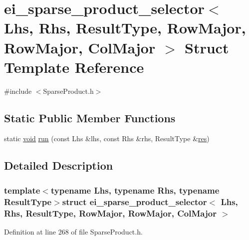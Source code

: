 \hypertarget{structei__sparse__product__selector_3_01_lhs_00_01_rhs_00_01_result_type_00_01_row_major_00_01_row_major_00_01_col_major_01_4}{\section{ei\-\_\-sparse\-\_\-product\-\_\-selector$<$ Lhs, Rhs, Result\-Type, Row\-Major, Row\-Major, Col\-Major $>$ Struct Template Reference}
\label{structei__sparse__product__selector_3_01_lhs_00_01_rhs_00_01_result_type_00_01_row_major_00_01_row_major_00_01_col_major_01_4}
}


{\ttfamily \#include $<$Sparse\-Product.\-h$>$}

\subsection*{Static Public Member Functions}
\begin{DoxyCompactItemize}
\item 
static \hyperlink{group___u_a_v_objects_plugin_ga444cf2ff3f0ecbe028adce838d373f5c}{void} \hyperlink{structei__sparse__product__selector_3_01_lhs_00_01_rhs_00_01_result_type_00_01_row_major_00_01_row_major_00_01_col_major_01_4_a41c17c70dc66444e35d3d739c19008bc}{run} (const Lhs \&lhs, const Rhs \&rhs, Result\-Type \&\hyperlink{glext_8h_a1dbb21208b9047cc8031ca9c840d3c2f}{res})
\end{DoxyCompactItemize}


\subsection{Detailed Description}
\subsubsection*{template$<$typename Lhs, typename Rhs, typename Result\-Type$>$struct ei\-\_\-sparse\-\_\-product\-\_\-selector$<$ Lhs, Rhs, Result\-Type, Row\-Major, Row\-Major, Col\-Major $>$}



Definition at line 268 of file Sparse\-Product.\-h.



